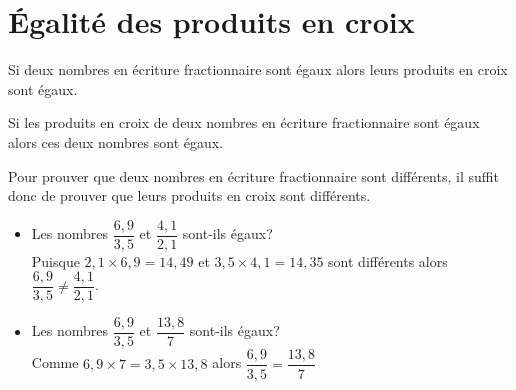 \section{Égalité des produits en croix}
\begin{propriete}[\admise]
    Si deux nombres en écriture fractionnaire sont égaux alors leurs produits en croix sont égaux.
\end{propriete}

\begin{propriete}
    Si les produits en croix de deux nombres en écriture fractionnaire sont égaux alors ces deux nombres sont égaux.
\end{propriete}

\begin{remarque}
    Pour prouver que deux nombres en écriture fractionnaire sont différents, il suffit donc de prouver que leurs produits en croix sont différents.
\end{remarque}

\begin{exemples*1}
    \begin{itemize}
        \item Les nombres $\dfrac{6,9}{3,5}$ et $\dfrac{4,1}{2,1}$ sont-ils égaux?\\
        Puisque $2,1\times6,9=14,49$ et $3,5\times4,1=14,35$ sont différents alors $\dfrac{6,9}{3,5}\neq \dfrac{4,1}{2,1}$.
        \item Les nombres $\dfrac{6,9}{3,5}$ et $\dfrac{13,8}{7}$ sont-ils égaux?\\
        Comme $6,9\times7=3,5\times13,8$ alors $\dfrac{6,9}{3,5}=\dfrac{13,8}{7}$
    \end{itemize}
\end{exemples*1}
